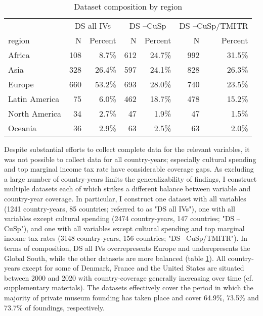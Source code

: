 \documentclass[11pt, authoryear]{elsarticle}
\begin{document}
\begin{table}[ht]
\centering
\begin{tabular}{p{2.5cm}rrrrrr}
  \hline 
 & \multicolumn{2}{c}{DS all IVs} & \multicolumn{2}{c}{DS --CuSp} & \multicolumn{2}{c}{DS --CuSp/TMITR} \\ 
\cmidrule(r){2-3}\cmidrule(r){4-5}\cmidrule(r){6-7} 
 region & N & Percent & N & Percent & N & Percent \\ 
  \hline
Africa & 108 &  8.7\% & 612 & 24.7\% & 992 & 31.5\% \\ 
  Asia & 328 & 26.4\% & 597 & 24.1\% & 828 & 26.3\% \\ 
  Europe & 660 & 53.2\% & 693 & 28.0\% & 740 & 23.5\% \\ 
  Latin America & 75 &  6.0\% & 462 & 18.7\% & 478 & 15.2\% \\ 
  North America & 34 &  2.7\% & 47 &  1.9\% & 47 &  1.5\% \\ 
  Oceania & 36 &  2.9\% & 63 &  2.5\% & 63 &  2.0\% \\ 
   \hline
\end{tabular}
\caption{Dataset composition by region} 
\label{tbl:cbn_cpsgn}
\end{table}
Despite substantial efforts to collect complete data for the relevant variables, it was not possible to collect data for all country-years; especially cultural spending and top marginal income tax rate have considerable coverage gaps.
As excluding a large number of country-years limits the generalizability of findings, I construct multiple datasets each of which strikes a different balance between variable and country-year coverage.
In particular, I construct one dataset with all variables (1241 country-years, 85 countries; referred to as "DS all IVs"), one with all variables except cultural spending (2474 country-years, 147 countries; "DS --CuSp"), and one with all variables except cultural spending and top marginal income tax rates (3148 country-years, 156 countries; "DS --CuSp/TMITR").
In terms of composition, DS all IVs overrepresents Europe and underepresents the Global South, while the other datasets are more balanced (table \ref{tbl:cbn_cpsgn}).
All country-years except for some of Denmark, France and the United States are situated between 2000 and 2020 with country-coverage generally increasing over time (cf. supplementary materials).
The datasets effectively cover the period in which the majority of private museum founding has taken place and cover 64.9\%, 73.5\% and 73.7\% of foundings, respectively.
\end{document}
